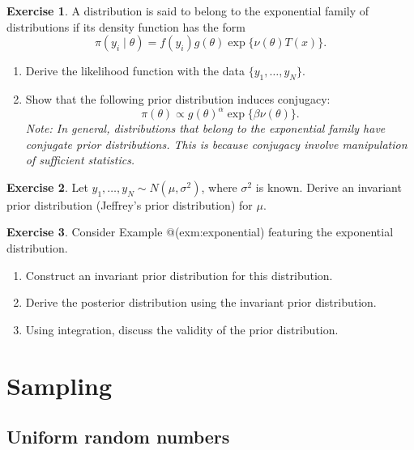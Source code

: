 \documentclass[
]{book}
\providecommand{\tightlist}{%
  \setlength{\itemsep}{0pt}\setlength{\parskip}{0pt}}
\theoremstyle{definition}
\theoremstyle{definition}
\theoremstyle{definition}
\newtheorem{exercise}{Exercise}[chapter]
\theoremstyle{definition}
\theoremstyle{remark}
\begin{document}
\begin{exercise}

A distribution is said to belong to the exponential family of distributions if its density function has the form
\[
\pi(y_i \mid \theta) = f(y_i)g(\theta)\exp\{\nu(\theta)T(x)\}. 
\]

\begin{enumerate}
\def\labelenumi{\arabic{enumi}.}
\tightlist
\item
  Derive the likelihood function with the data \(\{y_1, \ldots, y_N\}\).
\item
  Show that the following prior distribution induces conjugacy:
  \[
   \pi(\theta) \propto g(\theta)^\alpha\exp\{\beta\nu(\theta)\}.
   \]
  \emph{Note: In general, distributions that belong to the exponential family have conjugate prior distributions. This is because conjugacy involve manipulation of sufficient statistics.}
\end{enumerate}

\end{exercise}

\begin{exercise}
Let \(y_1, \ldots, y_N \sim N(\mu, \sigma^2)\), where \(\sigma^2\) is known. Derive an invariant prior distribution (Jeffrey's prior distribution) for \(\mu\).
\end{exercise}

\begin{exercise}

Consider Example @(exm:exponential) featuring the exponential distribution.

\begin{enumerate}
\def\labelenumi{\arabic{enumi}.}
\tightlist
\item
  Construct an invariant prior distribution for this distribution.
\item
  Derive the posterior distribution using the invariant prior distribution.
\item
  Using integration, discuss the validity of the prior distribution.
\end{enumerate}

\end{exercise}

\hypertarget{sampling}{%
\chapter{Sampling}\label{sampling}}

\hypertarget{uniform-random-numbers}{%
\section{Uniform random numbers}\label{uniform-random-numbers}}
\end{document}
